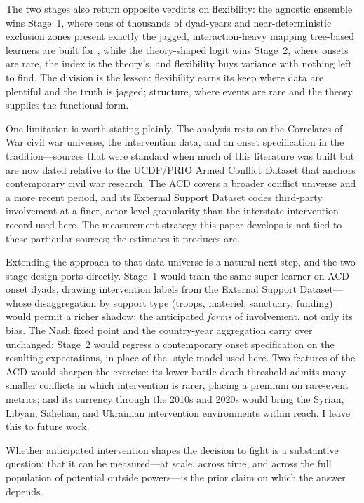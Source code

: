 The two stages also return opposite verdicts on flexibility: the agnostic
ensemble wins Stage~1, where tens of thousands of dyad-years and
near-deterministic exclusion zones present exactly the jagged,
interaction-heavy mapping tree-based learners are built for
\citep{montgomeryolivella2018}, while the theory-shaped logit wins Stage~2,
where onsets are rare, the index is the theory's, and flexibility buys
variance with nothing left to find.  The division is the lesson: flexibility
earns its keep where data are plentiful and the truth is jagged; structure,
where events are rare and the theory supplies the functional form.

One limitation is worth stating plainly.  The analysis rests on the
Correlates of War civil war universe, the \citet{regan2000} intervention data,
and an onset specification in the \citet{fearon2003} tradition---sources that
were standard when much of this literature was built but are now dated relative
to the UCDP/PRIO Armed Conflict Dataset \citep{gleditsch2002} that anchors
contemporary civil war research.  The ACD covers a broader conflict universe
and a more recent period, and its External Support Dataset \citep{meier2023}
codes third-party involvement at a finer, actor-level granularity than the
interstate intervention record used here.  The
measurement strategy this paper develops is not tied to these particular
sources; the estimates it produces are.

Extending the approach to that data universe is a natural next step, and the
two-stage design ports directly.  Stage~1 would train the same super-learner on
ACD onset dyads, drawing intervention labels from the External Support
Dataset---whose disaggregation by support type (troops, materiel, sanctuary,
funding) would permit a richer shadow: the anticipated \textit{forms} of
involvement, not only its bias.  The Nash fixed point and the country-year aggregation carry
over unchanged; Stage~2 would regress a contemporary onset specification on the
resulting expectations, in place of the \citet{fearon2003}-style model used
here.  Two features of the ACD would sharpen the exercise: its lower
battle-death threshold admits many smaller conflicts in which intervention is
rarer, placing a premium on rare-event metrics; and its
currency through the 2010s and 2020s would bring the Syrian, Libyan, Sahelian,
and Ukrainian intervention environments within reach.  I leave this to future
work.

Whether anticipated intervention shapes the decision to fight is a substantive
question; that it can be measured---at scale, across time, and across the full
population of potential outside powers---is the prior claim on which the
answer depends.
